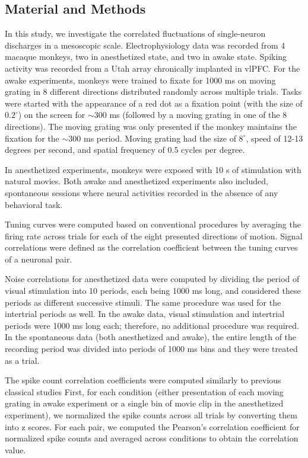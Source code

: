 \subsection*{Material and Methods}\label{sec:papers-pnas2018-material-methods}
In this study, we investigate the correlated fluctuations of single-neuron discharges in a mesoscopic scale.
Electrophysiology data was recorded from 4 macaque monkeys,
two in anesthetized state, and two in awake state.
Spiking activity was recorded from a Utah array chronically implanted in vlPFC.
For the awake experiments, monkeys were trained to fixate for 1000 ms on
moving grating in 8 different directions distributed randomly across multiple trials.
Tasks were started with the appearance of a red dot as a fixation point (with the size of $0.2^\circ$) on the screen for $\sim$300 ms (followed by a moving grating in one of the 8 directions).
The moving grating was only presented if the monkey maintains the fixation for the $\sim$300 ms period.
Moving grating had the size of $8^\circ$, speed of 12-13 degrees per second, and spatial frequency of 0.5 cycles per degree.

In anesthetized experiments, monkeys were exposed with 10 s of stimulation with natural movies.
Both awake and anesthetized experiments also included,
spontaneous sessions where neural activities recorded in the absence of any behavioral task.

Tuning curves were computed based on conventional procedures \cite{cohenMeasuringInterpretingNeuronal2011} by averaging the firing rate across trials for each of the eight presented directions of motion.
Signal correlations were defined as the correlation coefficient between the tuning curves of a neuronal pair.

Noise correlations for anesthetized data were computed by dividing the period of visual stimulation into 10 periods, each being 1000 ms long, and considered these periods as different successive stimuli.
The same procedure was used for the intertrial periods as well.
In the awake data, visual stimulation and intertrial periods were 1000 ms long each;
therefore, no additional procedure was required.
In the spontaneous data (both anesthetized and awake),
the entire length of the recording period was divided into periods of 1000 ms bins and they were treated as a trial.

The spike count correlation coefficients were computed similarly to previous classical studies
\cite{bairCorrelatedFiringMacaque2001a}
First, for each condition (either presentation of each moving grating in awake experiment or a single bin of movie clip in the anesthetized experiment),
we normalized the spike counts across all trials by converting them into z scores.
For each pair, we computed the Pearson's correlation coefficient for normalized spike counts and averaged across conditions to obtain the correlation value.


